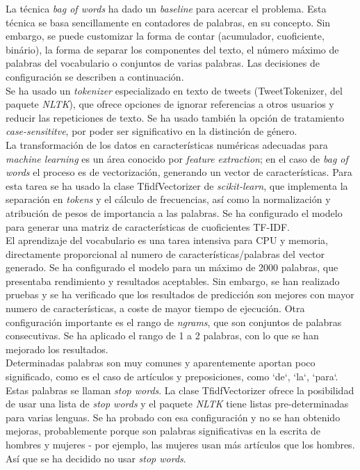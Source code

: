 \documentclass[11pt,a4paper]{article}
\begin{document}
  \indent La t\'ecnica {\em bag of words} ha dado un {\em baseline} para acercar el problema. Esta t\'ecnica se basa sencillamente en contadores de palabras, en su concepto. Sin embargo, se puede customizar la forma de contar (acumulador, cuoficiente, bin\'ario), la forma de separar los componentes del texto, el n\'umero m\'aximo de palabras del vocabulario o conjuntos de varias palabras. Las decisiones de configuraci\'on se describen a continuaci\'on.\\
  \indent Se ha usado un {\em tokenizer} especializado en texto de tweets ({\ttfamily TweetTokenizer}, del paquete {\em NLTK}), que ofrece opciones de ignorar referencias a otros usuarios y reducir las repeticiones de texto. Se ha usado tambi\'en la opci\'on de tratamiento {\em case-sensititve}, por poder ser significativo en la distinci\'on de g\'enero.\\
  \indent La transformaci\'on de los datos en caracter\'isticas num\'ericas adecuadas para {\em machine learning} es un \'area conocido por {\em feature extraction}; en el caso de {\em bag of words} el proceso es de vectorizaci\'on, generando un vector de caracter\'isticas. Para esta tarea se ha usado la clase {\ttfamily TfidfVectorizer} de {\em scikit-learn}, que implementa la separaci\'on en {\em tokens} y el c\'alculo de frecuencias, así como la normalizaci\'on y atribuci\'on de pesos de importancia a las palabras. Se ha configurado el modelo para generar una matriz de caracter\'isticas de cuoficientes TF-IDF.\\
  \indent El aprendizaje del vocabulario es una tarea intensiva para CPU y memoria, directamente proporcional al numero de caracter\'isticas/palabras del vector generado. Se ha configurado el modelo para un m\'aximo de 2000 palabras, que presentaba rendimiento y resultados aceptables. Sin embargo, se han realizado pruebas y se ha verificado que los resultados de predicci\'on son mejores con mayor numero de caracter\'isticas, a coste de mayor tiempo de ejecuci\'on. Otra configuraci\'on importante es el rango de {\em ngrams}, que son conjuntos de palabras consecutivas. Se ha aplicado el rango de 1 a 2 palabras, con lo que se han mejorado los resultados.\\
  \indent Determinadas palabras son muy comunes y aparentemente aportan poco significado, como es el caso de art\'iculos y preposiciones, como `de`, `la`, `para`. Estas palabras se llaman {\em stop words}. La clase {\ttfamily TfidfVectorizer} ofrece la posibilidad de usar una lista de {\em stop words} y el paquete {\em NLTK} tiene listas pre-determinadas para varias lenguas.  Se ha probado con esa configuraci\'on y no se han obtenido mejoras, probablemente porque son palabras significativas en la escrita de hombres y mujeres - por ejemplo, las mujeres usan m\'as art\'iculos que los hombres. As\'i que se ha decidido no usar {\em stop words}.
\end{document}
